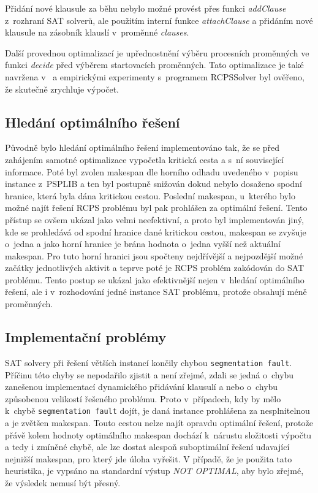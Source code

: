 \documentclass[a4paper, 12pt]{article}
\begin{document}
Přidání nové klausule za běhu nebylo možné provést přes funkci \emph{addClause} z~rozhraní SAT solverů, ale použitím
interní funkce \emph{attachClause} a přidáním nové klausule na zásobník klauslí v~proměnné \emph{clauses}.

Další provednou optimalizací je upřednostnění výběru procesních proměnných ve funkci \emph{decide} před výběrem
startovacích proměnných.
Tato optimalizace je také navržena v~\cite{horbach:10} a empirickými experimenty s~programem RCPSSolver
byl ověřeno, že skutečně zrychluje výpočet.

\subsection{Hledání optimálního řešení}
Původně bylo hledání optimálního řešení implementováno tak, že se před
zahájením samotné optimalizace vypočetla kritická cesta a s~ní související informace.
Poté byl zvolen makespan dle horního odhadu uvedeného v~popisu instance z~PSPLIB
a ten byl postupně snižován dokud nebylo dosaženo spodní hranice, která
byla dána kritickou cestou.
Poslední makespan, u~kterého bylo možné najít řešení RCPS problému byl pak prohlášen
za optimální řešení.
Tento přístup se ovšem ukázal jako velmi neefektivní, a proto byl
implementován jiný, kde se prohledává od spodní hranice dané kritickou cestou,
makespan se zvyšuje o~jedna a jako horní hranice je brána hodnota o~jedna
vyšší než aktuální makespan.
Pro tuto horní hranici jsou spočteny nejdřívější a nejpozdější možné začátky
jednotlivých aktivit a teprve poté je RCPS problém zakódován do SAT problému.
Tento postup se ukázal jako efektivnější nejen v~hledání optimálního řešení, ale i
v~rozhodování jedné instance SAT problému, protože obsahují méně proměnných. 

\subsection{Implementační problémy}
\label{sub:impl}
SAT solvery při řešení větších instancí končily chybou \texttt{segmentation fault}.
Příčinu této chyby se nepodařilo zjistit a není zřejmé, zdali se jedná
o~chybu zanešenou implementací dynamického přidávání klausulí a nebo o~chybu
způsobenou velikostí řešeného problému.
Proto v~případech, kdy by mělo k~chybě \texttt{segmentation fault} dojít,
je daná instance prohlášena za nesplnitelnou a je zvětšen makespan.
Touto cestou nelze najít opravdu optimální řešení, protože přávě kolem
hodnoty optimálního makespan dochází k~nárustu složitosti výpočtu a tedy
i zmíněné chybě, ale lze dostat alespoň suboptimální řešení udavající
nejnižší makespan, pro který jde úloha vyřešit.
V případě, že je použita tato heuristika, je vypsáno na standardní výstup
\emph{NOT OPTIMAL}, aby bylo zřejmé, že výsledek nemusí být přesný.
\end{document}
